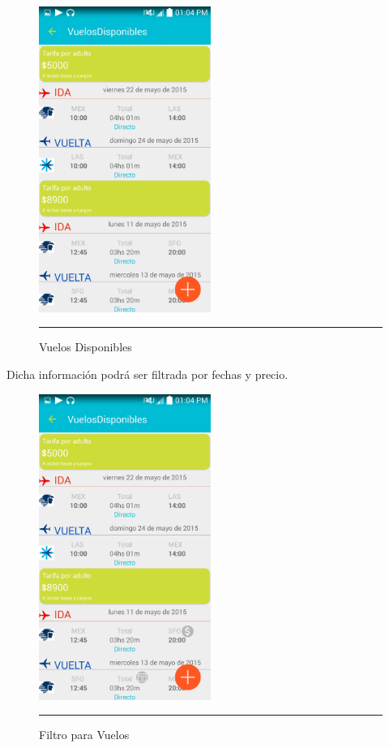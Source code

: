 \begin{figure}[h]
	\centering
		\includegraphics[width=0.5\textwidth]{Figuras/vuelosdisponibles.png}
		\rule{30em}{0.5pt}
	\caption[Vuelos Disponibles]{Vuelos Disponibles}
	\label{fig:vuelosDisponibles}
\end{figure}

Dicha información podrá ser filtrada por fechas y precio.

\begin{figure}[h]
	\centering
		\includegraphics[width=0.5\textwidth]{Figuras/filtrovuelos.png}
		\rule{30em}{0.5pt}
	\caption[Filtro para Vuelos]{Filtro para Vuelos}
	\label{fig:filtroVuelos}
\end{figure}
\clearpage

